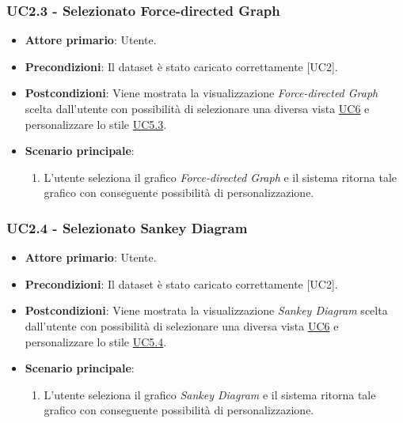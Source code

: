\subsubsection{UC2.3 - Selezionato Force-directed Graph}
\label{sec:UC2.3}
\begin{itemize}
    \item \textbf{Attore primario}: Utente.
    \item \textbf{Precondizioni}: Il dataset è stato caricato correttamente [UC2].
    \item \textbf{Postcondizioni}: Viene mostrata la visualizzazione \textit{Force-directed Graph} scelta dall'utente con possibilità di selezionare una diversa vista \hyperref[sec:UC6]{UC6} e personalizzare lo stile \hyperref[sec:UC5.3]{UC5.3}. %
    \item \textbf{Scenario principale}:
          \begin{enumerate}
              \item L'utente seleziona il grafico \textit{Force-directed Graph} e il sistema ritorna tale grafico con conseguente possibilità di personalizzazione. 
          \end{enumerate}
\end{itemize}

\subsubsection{UC2.4 - Selezionato Sankey Diagram}
\label{sec:UC2.4}
\begin{itemize}
    \item \textbf{Attore primario}: Utente.
    \item \textbf{Precondizioni}: Il dataset è stato caricato correttamente [UC2].
    \item \textbf{Postcondizioni}: Viene mostrata la visualizzazione \textit{Sankey Diagram} scelta dall'utente con possibilità di selezionare una diversa vista \hyperref[sec:UC6]{UC6} e personalizzare lo stile \hyperref[sec:UC5.4]{UC5.4}. %
    \item \textbf{Scenario principale}:
          \begin{enumerate}
              \item L'utente seleziona il grafico \textit{Sankey Diagram} e il sistema ritorna tale grafico con conseguente possibilità di personalizzazione. 
          \end{enumerate}
\end{itemize}
\newpage

